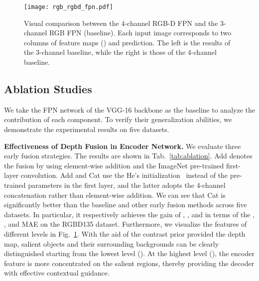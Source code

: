 \documentclass[runningheads]{llncs}
\begin{document}
 \begin{figure}
  \centering
  \texttt{[image: rgb\_rgbd\_fpn.pdf]}
  \caption{Visual comparison between the 4-channel RGB-D FPN and the 3-channel RGB FPN (baseline). Each input image corresponds to two columns of feature maps () and prediction. The left is the results of the 3-channel baseline, while the right is those of the 4-channel baseline. 
  }\label{fig:rgb_rgbd_fpn}
  \end{figure}


  
\subsection{Ablation Studies}
We take the FPN network of the VGG-16 backbone as the baseline to analyze the contribution of each component. To verify their generalization abilities, we demonstrate the experimental results on five datasets.

\textbf{Effectiveness of Depth Fusion in Encoder Network.} We evaluate three early fusion strategies. The results are shown in Tab.~\ref{tab:ablation}. Add denotes the fusion by using element-wise addition and the ImageNet pre-trained first-layer convolution. Add and Cat use the He's initialization~\cite{PRelu} instead of the pre-trained parameters in the first layer, and the latter adopts the 4-channel concatenation rather than element-wise addition. 
We can see that Cat is significantly better than the baseline and other early fusion methods across five datasets. In particular, it respectively achieves the gain of , ,  and  in terms of the , ,  and MAE on the RGBD135 dataset.
Furthermore, we visualize the features of different levels in Fig.~\ref{fig:rgb_rgbd_fpn}. With the aid of the contrast prior provided the depth map, salient objects and their surrounding backgrounds can be clearly distinguished starting from the lowest level (). At the highest level (), the encoder feature is more concentrated on the salient regions, thereby providing the decoder with effective contextual guidance. 
\end{document}
